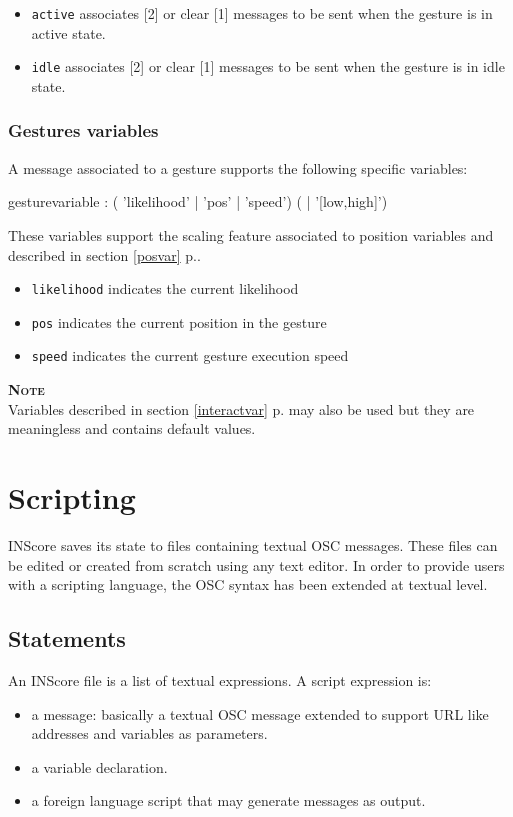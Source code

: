 \documentclass[a4paper,twoside]{report}
\newcommand{\toplevel}[1]	{\chapter{#1}}
\newcommand{\sublevel}[1]	{\section{#1}}
\newcommand{\subsublevel}[1]	{\subsection{#1}}
\newcommand{\fullref}[1]	{\ref{#1} p.\pageref{#1}}
\newcommand{\OSC}[1]		{\texttt{#1}}
\newcommand{\note}	[1]		{\vspace{2mm}\textbf{\hspace{-1.03cm}\textbf{\textsc{Note #1}}}}
\begin{document}
\begin{itemize}
\item \OSC{active} associates [2] or clear [1] messages to be sent when the gesture is in active state.
\item \OSC{idle} associates [2] or clear [1] messages to be sent when the gesture is in idle state.
\end{itemize}

\subsublevel{Gestures variables}\label{gfvar}

A message associated to a gesture supports the following specific variables:
\begin{rail}
gesturevariable : 
		(  'likelihood'
		| 'pos'
		| 'speed') ( | '[low,high]')  
\end{rail}
These variables support the scaling feature associated to position variables and described in section \fullref{posvar}.
\begin{itemize}
\item \OSC{likelihood} indicates the current likelihood 
\item \OSC{pos} indicates the current position in the gesture 
\item \OSC{speed} indicates the current gesture execution speed 
\end{itemize}

\note{}\\
Variables described in section \fullref{interactvar} may also be used but they are meaningless and contains default values.


\toplevel{Scripting}
\label{scripting}

INScore saves its state to files containing textual OSC messages. These files can be edited or created from scratch using any text editor. In order to provide users with a scripting language, the OSC syntax has been extended at textual level.

\sublevel{Statements}\label{scriptstatement}
An INScore file is a list of textual expressions. A script expression is:
\begin{itemize}
\item a message: basically a textual OSC message extended to support URL like addresses and variables as parameters.
\item a variable declaration.
\item a foreign language script that may generate messages as output.
\end{itemize}
\end{document}
